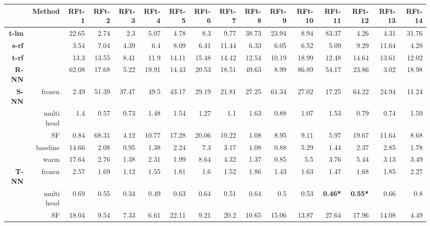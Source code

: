 \begin{table}
\begin{flushleft}
\begin{tabular}{rrrrrrrrrrrrrrrr}
 {} & {\textbf{Method}} & {\textbf{RFt-1}} & {\textbf{RFt-2}} & {\textbf{RFt-3}} & {\textbf{RFt-4}} & {\textbf{RFt-5}} & {\textbf{RFt-6}} & {\textbf{RFt-7}} & {\textbf{RFt-8}} & {\textbf{RFt-9}} & {\textbf{RFt-10}} & {\textbf{RFt-11}} & {\textbf{RFt-12}} & {\textbf{RFt-13}} & {\textbf{RFt-14}} \\ 
  \hline
{\textbf{t-lm}} &  & 22.65 & 2.74 & 2.3 & 5.07 & 4.78 & 8.3 & 9.77 & 38.73 & 23.94 & 8.94 & 83.37 & 4.26 & 4.31 & 31.76 \\ 
   \hline
{\textbf{s-rf}} &  & 3.54 & 7.04 & 4.39 & 6.4 & 8.09 & 6.41 & 11.44 & 6.33 & 6.05 & 6.52 & 5.09 & 9.29 & 11.64 & 4.28 \\ 
   \hline
{\textbf{t-rf}} &  & 13.3 & 13.55 & 8.41 & 11.9 & 14.11 & 15.48 & 14.42 & 12.54 & 10.19 & 18.99 & 12.48 & 14.64 & 13.61 & 12.02 \\ 
   \hline
{\textbf{R-NN}} &  & 62.08 & 17.68 & 5.22 & 19.91 & 14.43 & 20.53 & 18.51 & 49.63 & 8.99 & 86.89 & 54.17 & 23.86 & 3.02 & 18.98 \\ 
   \hline
{\textbf{S-NN}} & frozen & 2.49 & 51.39 & 37.47 & 49.5 & 43.17 & 29.19 & 21.81 & 27.25 & 61.34 & 27.02 & 17.25 & 64.22 & 24.94 & 11.24 \\ 
   & multi head & 1.4 & 0.57 & 0.73 & 1.48 & 1.54 & 1.27 & 1.1 & 1.63 & 0.88 & 1.07 & 1.53 & 0.79 & 0.74 & 1.59 \\ 
   & SF & 0.84 & 68.31 & 4.12 & 10.77 & 17.28 & 20.06 & 10.22 & 1.08 & 8.95 & 9.11 & 5.97 & 19.67 & 11.64 & 8.68 \\ 
   & baseline & 14.66 & 2.08 & 0.95 & 1.38 & 2.24 & 7.3 & 3.17 & 1.08 & 0.88 & 5.29 & 1.44 & 2.37 & 2.85 & 1.78 \\ 
   & warm & 17.64 & 2.76 & 1.38 & 2.31 & 1.99 & 8.64 & 4.32 & 1.37 & 0.85 & 5.5 & 3.76 & 5.44 & 3.13 & 3.49 \\ 
   \hline
{\textbf{T-NN}} & frozen & 2.57 & 1.69 & 1.12 & 1.55 & 1.81 & 1.6 & 1.52 & 1.86 & 1.43 & 1.63 & 1.47 & 1.68 & 1.85 & 2.27 \\ 
   & multi head & 0.69 & 0.55 & 0.34 & 0.49 & 0.63 & 0.64 & 0.51 & 0.64 & 0.5 & 0.53 & {\textbf{0.46*}} & {\textbf{0.55*}} & 0.66 & 0.8 \\ 
   & SF & 18.04 & 9.54 & 7.33 & 6.61 & 22.11 & 9.21 & 20.2 & 10.65 & 15.06 & 13.87 & 27.64 & 17.96 & 14.08 & 4.49 \\ 

\end{tabular}
\end{flushleft}
\end{table}
